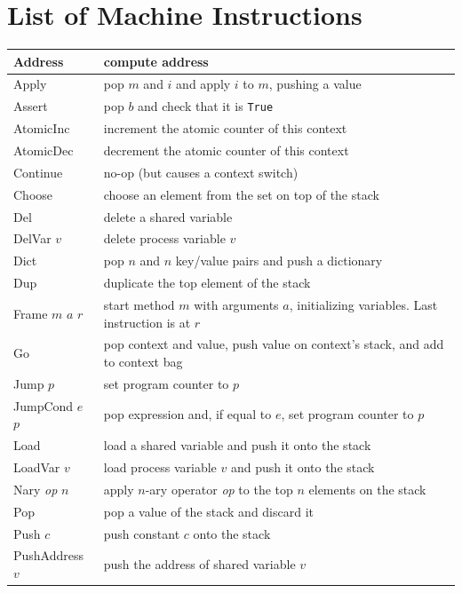 \documentclass{report}
\begin{document}
\chapter{List of Machine Instructions}
\label{ap:cxlbytecode}

\vspace{1em}
\begin{tabular}{|l|l|}
\hline
Address & compute address \\
\hline
Apply & pop $m$ and $i$ and apply $i$ to $m$, pushing a value \\
\hline
Assert & pop $b$ and check that it is \texttt{True} \\
\hline
AtomicInc & increment the atomic counter of this context \\
\hline
AtomicDec & decrement the atomic counter of this context \\
\hline
Continue & no-op (but causes a context switch) \\
\hline
Choose & choose an element from the set on top of the stack \\
\hline
Del & delete a shared variable \\
\hline
DelVar $v$ & delete process variable $v$ \\
\hline
Dict & pop $n$ and $n$ key/value pairs and push a dictionary \\
\hline
Dup & duplicate the top element of the stack \\
\hline
Frame $m$ $a$ $r$& start method $m$ with arguments $a$,
initializing variables.  Last instruction is at $r$ \\
\hline
Go & pop context and value, push value on context's stack, and add to context bag \\
\hline
Jump $p$ & set program counter to $p$ \\
\hline
JumpCond $e$ $p$ & pop expression and, if equal to $e$, set program counter to $p$ \\
\hline
Load & load a shared variable and push it onto the stack \\
\hline
LoadVar $v$ & load process variable $v$ and push it onto the stack \\
\hline
Nary \textit{op} $n$ & apply $n$-ary operator \textit{op} to the top $n$ elements on the stack \\
\hline
Pop & pop a value of the stack and discard it \\
\hline
Push $c$ & push constant $c$ onto the stack \\
\hline
PushAddress $v$ & push the address of shared variable $v$ \\

\end{tabular}
\end{document}

